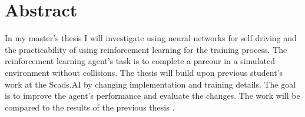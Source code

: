 \section*{Abstract}
\label{sec:Abstract}

In my master's thesis I will investigate using neural networks for self driving and the practicability of using reinforcement learning for the training process. The reinforcement learning agent's task is to complete a parcour in a simulated environment without collisions. The thesis will build upon previous student's work at the Scads.AI by changing implementation and training details. The goal is to improve the agent's performance and evaluate the changes. The work will be compared to the results of the previous thesis \autocite{maximilian}.


